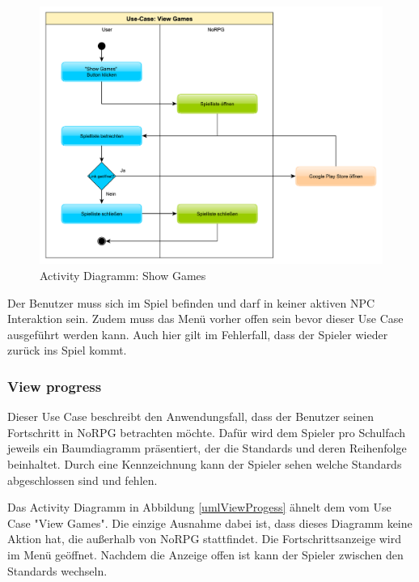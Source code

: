			\begin{figure}[htbp]
				\centering 
				\label{umlShowGames}
				\includegraphics[width=12cm]{pics/ShowGames.pdf}
				\caption{Activity Diagramm: Show Games}
			\end{figure}

			Der Benutzer muss sich im Spiel befinden und darf in keiner aktiven \ac{NPC} Interaktion sein. Zudem muss das Menü vorher offen sein bevor dieser Use Case ausgeführt werden kann. Auch hier gilt im Fehlerfall, dass der Spieler wieder zurück ins Spiel kommt.
	
		\subsubsection{View progress}
			Dieser Use Case beschreibt den Anwendungsfall, dass der Benutzer seinen Fortschritt in NoRPG betrachten möchte. Dafür wird dem Spieler pro Schulfach jeweils ein Baumdiagramm präsentiert, der die Standards und deren Reihenfolge beinhaltet. Durch eine Kennzeichnung kann der Spieler sehen welche Standards abgeschlossen sind und fehlen.  
			
			Das Activity Diagramm in Abbildung \ref{umlViewProgess} ähnelt dem vom Use Case "View Games". Die einzige Ausnahme dabei ist, dass dieses Diagramm keine Aktion hat, die außerhalb von NoRPG stattfindet. Die Fortschrittsanzeige wird im Menü geöffnet. Nachdem die Anzeige offen ist kann der Spieler zwischen den Standards wechseln.
			
